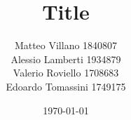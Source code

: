 \documentclass[12pt,a4paper,oneside]{article}
\title{Title}	                                    %
\author{Matteo Villano 1840807 \\ Alessio Lamberti 1934879 \\ Valerio Roviello 1708683 \\ Edoardo Tomassini 1749175}				                %
\date{\today}									    %
\theoremstyle{definition}
\begin{document}

\newpage
\tableofcontents
\newpage

\clearpage

\clearpage

\clearpage


\nocite{*}  %
\end{document}
